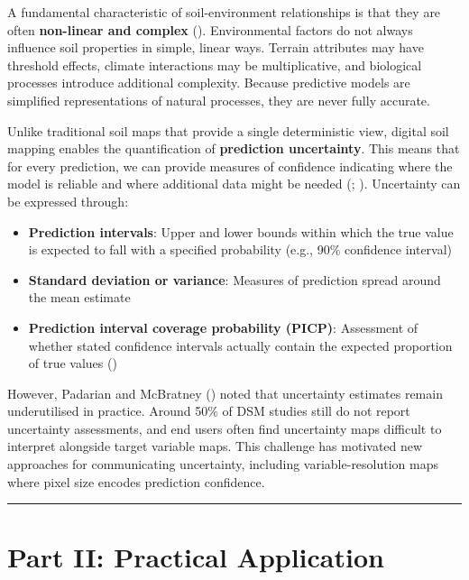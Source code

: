 \documentclass[
  10pt,
  b5paper,
  oneside]{book}
\providecommand{\tightlist}{%
  \setlength{\itemsep}{0pt}\setlength{\parskip}{0pt}}
\begin{document}
A fundamental characteristic of soil-environment relationships is that they are often \textbf{non-linear and complex} (). Environmental factors do not always influence soil properties in simple, linear ways. Terrain attributes may have threshold effects, climate interactions may be multiplicative, and biological processes introduce additional complexity. Because predictive models are simplified representations of natural processes, they are never fully accurate.

Unlike traditional soil maps that provide a single deterministic view, digital soil mapping enables the quantification of \textbf{prediction uncertainty}. This means that for every prediction, we can provide measures of confidence indicating where the model is reliable and where additional data might be needed (; ). Uncertainty can be expressed through:

\begin{itemize}
\tightlist
\item
  \textbf{Prediction intervals}: Upper and lower bounds within which the true value is expected to fall with a specified probability (e.g., 90\% confidence interval)
\item
  \textbf{Standard deviation or variance}: Measures of prediction spread around the mean estimate
\item
  \textbf{Prediction interval coverage probability (PICP)}: Assessment of whether stated confidence intervals actually contain the expected proportion of true values ()
\end{itemize}

However, Padarian and McBratney () noted that uncertainty estimates remain underutilised in practice. Around 50\% of DSM studies still do not report uncertainty assessments, and end users often find uncertainty maps difficult to interpret alongside target variable maps. This challenge has motivated new approaches for communicating uncertainty, including variable-resolution maps where pixel size encodes prediction confidence.

\begin{center}\rule{0.5\linewidth}{0.5pt}\end{center}

\section*{Part II: Practical Application}\label{part-ii-practical-application}
\end{document}
